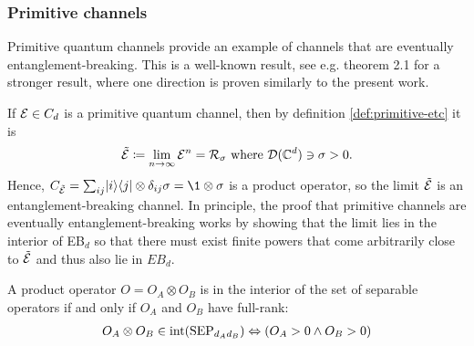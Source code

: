 \subsubsection{Primitive channels}
Primitive quantum channels provide an example of channels that are eventually entanglement-breaking. This is a well-known result, see e.g. theorem 2.1 \cite{hansonEventuallyEntanglementBreaking2020} for a stronger result, where one direction is proven similarly to the present work.

If $\mathcal E \in C_d$ is a primitive quantum channel, then by definition \ref{def:primitive-etc} it is 
\begin{align}
    \tilde{ \mathcal E }\coloneqq \lim_{n \rightarrow \infty}\mathcal E^n = \mathcal R_\sigma \text{ where } \mathcal D(\mathbb{C}^d)\ni\sigma > 0.
\end{align}
Hence, $C_{\tilde {\m E}}= \sum_{ij}\ket{i} \bra j \otimes \delta_{ij}\sigma = \1 \otimes \sigma$ is a product operator, so the limit $\tilde  {\mathcal E}$ is an entanglement-breaking channel. In principle, the proof that primitive channels are eventually entanglement-breaking works by showing that the limit lies in the interior of EB$_d$ so that there must exist finite powers that come arbitrarily close to $\tilde{\mathcal E}$ and thus also lie in $EB_d$.
\begin{lemma}
    A product operator $O = O_A \otimes O_B$ is in the interior of the set of separable operators if and only if $O_A$ and $O_B$ have full-rank:
    \begin{align*}
        O_A \otimes O_B \in \mathrm{int}(\mathrm{SEP}_{d_A d_B}) \Leftrightarrow (O_A > 0 \wedge O_B > 0)
    \end{align*}
\end{lemma}
